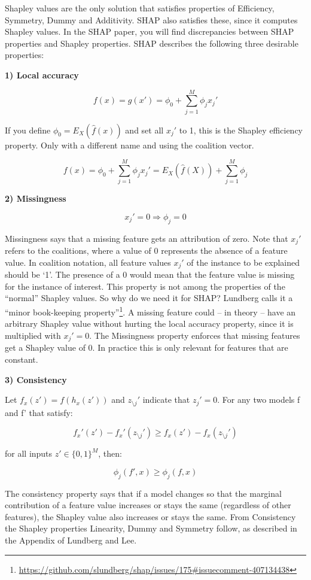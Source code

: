 \documentclass[12pt,]{krantz}
\renewcommand{\href}[2]{#2\footnote{\url{#1}}}
\begin{document}
Shapley values are the only solution that satisfies properties of
Efficiency, Symmetry, Dummy and Additivity. SHAP also satisfies these,
since it computes Shapley values. In the SHAP paper, you will find
discrepancies between SHAP properties and Shapley properties. SHAP
describes the following three desirable properties:

\textbf{1) Local accuracy}

\[f(x)=g(x')=\phi_0+\sum_{j=1}^M\phi_jx_j'\]

If you define \(\phi_0=E_X(\hat{f}(x))\) and set all \(x_j'\) to 1, this
is the Shapley efficiency property. Only with a different name and using
the coalition vector.

\[f(x)=\phi_0+\sum_{j=1}^M\phi_jx_j'=E_X(\hat{f}(X))+\sum_{j=1}^M\phi_j\]

\textbf{2) Missingness}

\[x_j'=0\Rightarrow\phi_j=0\]

Missingness says that a missing feature gets an attribution of zero.
Note that \(x_j'\) refers to the coalitions, where a value of 0
represents the absence of a feature value. In coalition notation, all
feature values \(x_j'\) of the instance to be explained should be `1'.
The presence of a 0 would mean that the feature value is missing for the
instance of interest. This property is not among the properties of the
``normal'' Shapley values. So why do we need it for SHAP? Lundberg calls
it a
\href{https://github.com/slundberg/shap/issues/175\#issuecomment-407134438}{``minor
book-keeping property''}. A missing feature could -- in theory -- have
an arbitrary Shapley value without hurting the local accuracy property,
since it is multiplied with \(x_j'=0\). The Missingness property
enforces that missing features get a Shapley value of 0. In practice
this is only relevant for features that are constant.

\textbf{3) Consistency}

Let \(f_x(z')=f(h_x(z'))\) and \(z_{\setminus{}j}'\) indicate that
\(z_j'=0\). For any two models f and f' that satisfy:

\[f_x'(z')-f_x'(z_{\setminus{}j}')\geq{}f_x(z')-f_x(z_{\setminus{}j}')\]

for all inputs \(z'\in\{0,1\}^M\), then:

\[\phi_j(f',x)\geq\phi_j(f,x)\]

The consistency property says that if a model changes so that the
marginal contribution of a feature value increases or stays the same
(regardless of other features), the Shapley value also increases or
stays the same. From Consistency the Shapley properties Linearity, Dummy
and Symmetry follow, as described in the Appendix of Lundberg and Lee.
\end{document}
